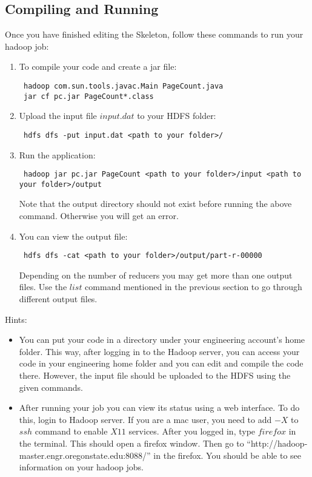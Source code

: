 \documentclass[11pt]{article}
\begin{document}
\subsection*{Compiling and Running}
\noindent Once you have finished editing the Skeleton, follow these commands to run your hadoop job:
\begin{enumerate}
\item To compile your code and create a jar file:
\begin{verbatim}
 hadoop com.sun.tools.javac.Main PageCount.java
 jar cf pc.jar PageCount*.class
\end{verbatim}
\item Upload the input file $input.dat$ to your HDFS folder:
\begin{verbatim}
 hdfs dfs -put input.dat <path to your folder>/
\end{verbatim}
\item Run the application:
\begin{verbatim}
 hadoop jar pc.jar PageCount <path to your folder>/input <path to your folder>/output
\end{verbatim}
Note that the output directory should not exist before running the above command. Otherwise you will get an error. 
\item You can view the output file:
\begin{verbatim}
 hdfs dfs -cat <path to your folder>/output/part-r-00000
\end{verbatim}
Depending on the number of reducers you may get more than one output files. Use the $list$ command mentioned in the previous section to go through different output files.
\end{enumerate}
Hints:
\begin{itemize}
 \item You can put your code in a directory under your engineering account's home folder. This way, after logging in to the Hadoop server, you can access your code in your engineering home folder and you can edit and compile the code there. However, the input file should be uploaded to the HDFS using the given commands.
 \item After running your job you can view its status using a web interface. To do this, login to Hadoop server. If you are a mac user, you need to add $-X$ to $ssh$ command to enable $X11$ services. After you logged in, type $firefox$ in the terminal. This should open a firefox window. Then go to ``http://hadoop-master.engr.oregonstate.edu:8088/'' in the firefox. You should be able to see information on your hadoop jobs.
\end{itemize}
\end{document}
